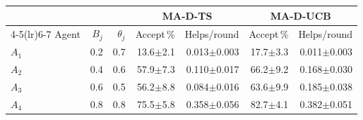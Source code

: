 \begin{tabular}{lrrrrrr}
\toprule
 & & & \multicolumn{2}{c}{MA-D-TS} & \multicolumn{2}{c}{MA-D-UCB} \\
\cmidrule(lr){4-5}\cmidrule(lr){6-7}
Agent & $B_j$ & $\theta_j$ & Accept\,\% & Helps/round & Accept\,\% & Helps/round \\
\midrule
$A_1$ & 0.2 & 0.7 & 13.6{\scriptsize$\pm$2.1} & 0.013{\scriptsize$\pm$0.003} & 17.7{\scriptsize$\pm$3.3} & 0.011{\scriptsize$\pm$0.003} \\
$A_2$ & 0.4 & 0.6 & 57.9{\scriptsize$\pm$7.3} & 0.110{\scriptsize$\pm$0.017} & 66.2{\scriptsize$\pm$9.2} & 0.168{\scriptsize$\pm$0.030} \\
$A_3$ & 0.6 & 0.5 & 56.2{\scriptsize$\pm$8.8} & 0.084{\scriptsize$\pm$0.016} & 63.6{\scriptsize$\pm$9.9} & 0.185{\scriptsize$\pm$0.038} \\
$A_4$ & 0.8 & 0.8 & 75.5{\scriptsize$\pm$5.8} & 0.358{\scriptsize$\pm$0.056} & 82.7{\scriptsize$\pm$4.1} & 0.382{\scriptsize$\pm$0.051} \\
\bottomrule
\end{tabular}

